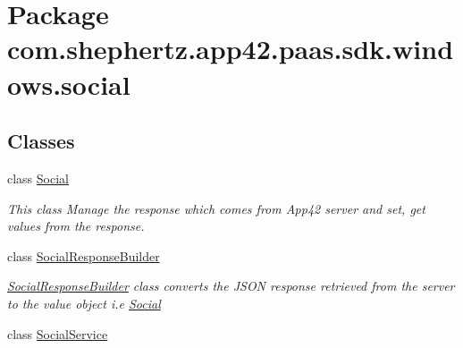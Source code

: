 \hypertarget{namespacecom_1_1shephertz_1_1app42_1_1paas_1_1sdk_1_1windows_1_1social}{\section{Package com.\+shephertz.\+app42.\+paas.\+sdk.\+windows.\+social}
\label{namespacecom_1_1shephertz_1_1app42_1_1paas_1_1sdk_1_1windows_1_1social}
}
\subsection*{Classes}
\begin{DoxyCompactItemize}
\item 
class \hyperlink{classcom_1_1shephertz_1_1app42_1_1paas_1_1sdk_1_1windows_1_1social_1_1_social}{Social}
\begin{DoxyCompactList}\small\item\em This class Manage the response which comes from App42 server and set, get values from the response. \end{DoxyCompactList}\item 
class \hyperlink{classcom_1_1shephertz_1_1app42_1_1paas_1_1sdk_1_1windows_1_1social_1_1_social_response_builder}{Social\+Response\+Builder}
\begin{DoxyCompactList}\small\item\em \hyperlink{classcom_1_1shephertz_1_1app42_1_1paas_1_1sdk_1_1windows_1_1social_1_1_social_response_builder}{Social\+Response\+Builder} class converts the J\+S\+O\+N response retrieved from the server to the value object i.\+e \hyperlink{classcom_1_1shephertz_1_1app42_1_1paas_1_1sdk_1_1windows_1_1social_1_1_social}{Social} \end{DoxyCompactList}\item 
class \hyperlink{classcom_1_1shephertz_1_1app42_1_1paas_1_1sdk_1_1windows_1_1social_1_1_social_service}{Social\+Service}
\end{DoxyCompactItemize}
